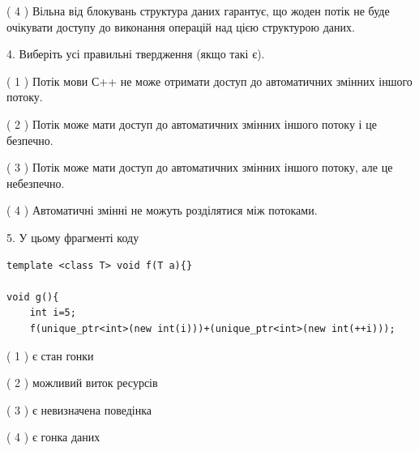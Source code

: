 \documentclass[12pt, ukrainian]{article}
\begin{document}
\begin {large}
{( 4 ) Вільна від блокувань структура даних гарантує, що жоден потік не буде очікувати доступу до виконання операцій над цією структурою даних.%


4. Виберіть усі правильні твердження (якщо такі є).\par
\vspace{2mm}

( 1 ) Потік мови С++ не може отримати доступ до автоматичних змінних іншого потоку.%

( 2 ) Потік може мати доступ до автоматичних змінних іншого потоку і це безпечно.%

( 3 ) Потік може мати доступ до автоматичних змінних іншого потоку, але це небезпечно.%

( 4 ) Автоматичні змінні не можуть розділятися між потоками.%


5. У цьому фрагменті коду
\begin{verbatim}
template <class T> void f(T a){}

void g(){
    int i=5;
    f(unique_ptr<int>(new int(i)))+(unique_ptr<int>(new int(++i)));
\end{verbatim}
( 1 ) є стан гонки%

( 2 ) можливий виток ресурсів%

( 3 ) є невизначена поведінка%

( 4 ) є гонка даних%
}
\end {large}
\end{document}
